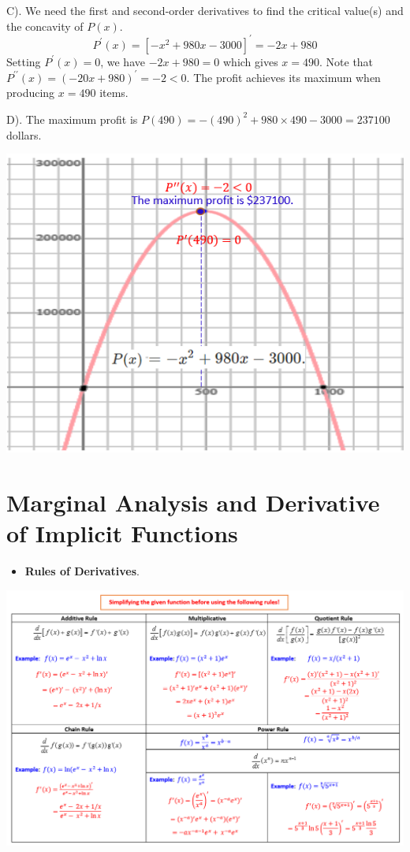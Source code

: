 \documentclass[
]{book}
\providecommand{\tightlist}{%
  \setlength{\itemsep}{0pt}\setlength{\parskip}{0pt}}
\begin{document}
C). We need the first and second-order derivatives to find the critical value(s) and the concavity of \(P(x)\).
\[
P^\prime(x) = [-x^2 + 980x - 3000]^\prime = -2x + 980
\]
Setting \(P^\prime(x) = 0\), we have \(-2x + 980 = 0\) which gives \(x = 490\). Note that \(P^{\prime\prime}(x) = (-20x + 980)^\prime = -2 < 0\). The profit achieves its maximum when producing \(x = 490\) items.

D). The maximum profit is \(P(490) =-(490)^2 + 980\times 490 - 3000 = 237100\) dollars.

\begin{center}\includegraphics[width=0.55\linewidth]{img09/w09-example06} \end{center}

\hypertarget{marginal-analysis-and-derivative-of-implicit-functions}{%
\chapter{Marginal Analysis and Derivative of Implicit Functions}\label{marginal-analysis-and-derivative-of-implicit-functions}}

\hfill\break

\begin{itemize}
\tightlist
\item
  \textbf{Rules of Derivatives}.
\end{itemize}

\begin{center}\includegraphics[width=0.99\linewidth]{img10/w10-RuleDerivatives} \end{center}
\end{document}

